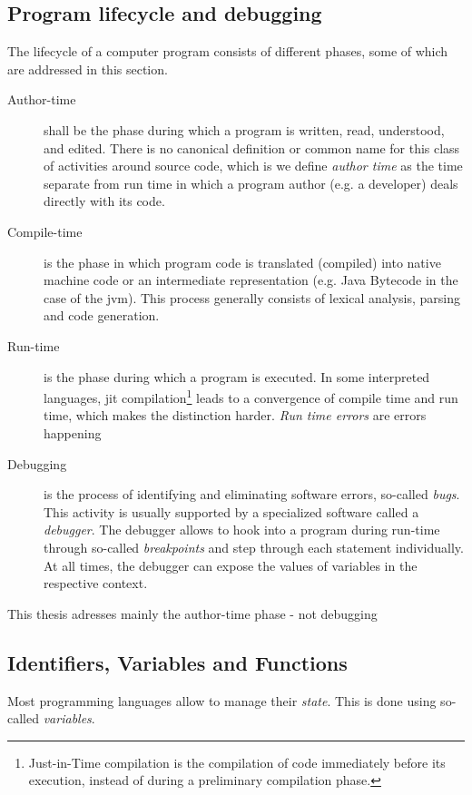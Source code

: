 \subsection{Program lifecycle and
debugging}\label{program-lifecycle-and-debugging}

The lifecycle of a computer program consists of different phases, some
of which are addressed in this section.

\begin{description}
\item[Author-time]
shall be the phase during which a program is written, read, understood,
and edited. There is no canonical definition or common name for this
class of activities around source code, which is we define \emph{author
time} as the time separate from run time in which a program author (e.g.
a developer) deals directly with its code.
\item[Compile-time]
is the phase in which program code is translated (compiled) into native
machine code or an intermediate representation (e.g. Java Bytecode in
the case of the \ac{jvm}). This process generally consists of lexical
analysis, parsing and code generation.
\item[Run-time]
is the phase during which a program is executed. In some interpreted
languages, \ac{jit} compilation\footnote{Just-in-Time compilation is the
  compilation of code immediately before its execution, instead of
  during a preliminary compilation phase.} leads to a convergence of
compile time and run time, which makes the distinction harder. \emph{Run
time errors} are errors happening
\item[Debugging]
is the process of identifying and eliminating software errors, so-called
\emph{bugs}. This activity is usually supported by a specialized
software called a \emph{debugger}. The debugger allows to hook into a
program during run-time through so-called \emph{breakpoints} and step
through each statement individually. At all times, the debugger can
expose the values of variables in the respective context.
\end{description}

This thesis adresses mainly the author-time phase - not debugging

\subsection{Identifiers, Variables and
Functions}\label{identifiers-variables-and-functions}

Most programming languages allow to manage their \emph{state}. This is
done using so-called \emph{variables}.

